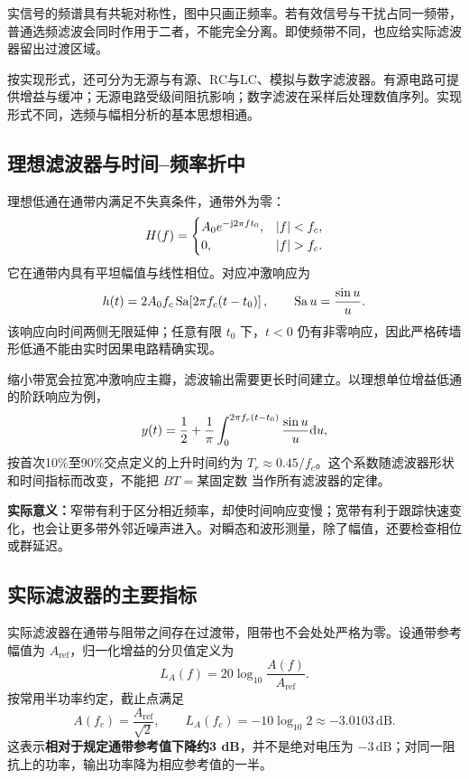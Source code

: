 实信号的频谱具有共轭对称性，图中只画正频率。若有效信号与干扰占同一频带，普通选频滤波会同时作用于二者，不能完全分离。即使频带不同，也应给实际滤波器留出过渡区域。

按实现形式，还可分为无源与有源、RC与LC、模拟与数字滤波器。有源电路可提供增益与缓冲；无源电路受级间阻抗影响；数字滤波在采样后处理数值序列。实现形式不同，选频与幅相分析的基本思想相通。

\subsection{理想滤波器与时间--频率折中}

理想低通在通带内满足不失真条件，通带外为零：
\[
H(f)=\begin{cases}
A_0e^{-\iu2\pi ft_0},&|f|<f_c,\\
0,&|f|>f_c.
\end{cases}
\]
它在通带内具有平坦幅值与线性相位。对应冲激响应为
\[
h(t)=2A_0f_c\operatorname{Sa}\!\left[2\pi f_c(t-t_0)\right],
\qquad \operatorname{Sa} u=\frac{\sin u}{u}.
\]
该响应向时间两侧无限延伸；任意有限 $t_0$ 下，$t<0$ 仍有非零响应，因此严格砖墙形低通不能由实时因果电路精确实现。

缩小带宽会拉宽冲激响应主瓣，滤波输出需要更长时间建立。以理想单位增益低通的阶跃响应为例，
\[
y(t)=\frac12+\frac1\pi\int_0^{2\pi f_c(t-t_0)}\frac{\sin u}{u}\mathrm{d} u,
\]
按首次10\%至90\%交点定义的上升时间约为 $T_r\approx0.45/f_c$。这个系数随滤波器形状和时间指标而改变，不能把 $BT=\text{某固定数}$ 当作所有滤波器的定律。

\textbf{实际意义：}窄带有利于区分相近频率，却使时间响应变慢；宽带有利于跟踪快速变化，也会让更多带外邻近噪声进入。对瞬态和波形测量，除了幅值，还要检查相位或群延迟。

\subsection{实际滤波器的主要指标}

实际滤波器在通带与阻带之间存在过渡带，阻带也不会处处严格为零。设通带参考幅值为 $A_{\mathrm{ref}}$，归一化增益的分贝值定义为
\[
L_A(f)=20\log_{10}\frac{A(f)}{A_{\mathrm{ref}}}.
\]
按常用半功率约定，截止点满足
\[
\boxed{A(f_c)=\frac{A_{\mathrm{ref}}}{\sqrt2}},\qquad
L_A(f_c)=-10\log_{10}2\approx-3.0103\,\mathrm{dB}.
\]
这表示\textbf{相对于规定通带参考值下降约3 dB}，并不是绝对电压为 $-3\,\mathrm{dB}$；对同一阻抗上的功率，输出功率降为相应参考值的一半。

